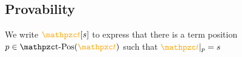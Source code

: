 \subsection{Provability}

We write $\foxt[s]$ to express that there is a term position $p\in\posT(\foxt)$ such that $\foxt|_p = s$ 

